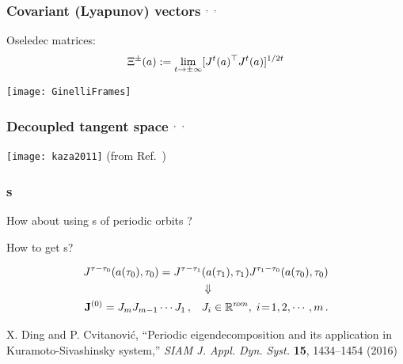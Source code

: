 \begin{frame}
  \frametitle{Covariant (Lyapunov) vectors
    $^,$
    $^,$
    }

  Oseledec matrices:
  \begin{equation}
    \Xi^{\pm}(a) :=\lim_{t\to\pm\infty}[J^t(a)^\top J^{t}(a)]^{1/2t}
    \label{eq:oseledets}
  \end{equation}

  {\centering
    \texttt{[image: GinelliFrames]}
  \par}

\end{frame}

\begin{frame}
  \frametitle{Decoupled tangent space
    $^,$
    $^,$
  }

  {\centering
    \texttt{[image: kaza2011]} %
    \scriptsize
    (from Ref.~)
    \par}

\end{frame}

\begin{frame}[shrink]%
  \frametitle{\Fv s}

  \begin{center}
    \large How about using \Fv s of periodic orbits ?
  \end{center}

  \pause

  \begin{center}
    \large How to get \Fv s?
  \end{center}

  \pause

  \begin{align*}
    J^{\tau-\tau_{0}}(a(\tau_{0}) ,\tau_{0})
    =
    J^{\tau-\tau_{1}} & (a(\tau_{1}),\tau_{1})
    J^{\tau_{1}-\tau_{0}}(a(\tau_{0}),\tau_{0})
    \\
    & \Downarrow \\
    \mathbf{J}^{(0)}=J_{m}J_{m-1}\cdots J_{1}\,,\quad
    & J_{i}\in \mathbb{R}^{n\!\times\! n},\; i\!=\!1,2,\cdots,m
    \,.
  \end{align*}


  \vfill


  \begin{block}{ \Ped }
    \textrm{
      \small
      X. Ding  and P. Cvitanovi\'c,
      ``Periodic eigendecomposition and its application in
      Kuramoto-Sivashinsky system,''
      {\color{red} \emph{SIAM J. Appl. Dyn. Syst.}} {\bf 15}, 1434--1454 (2016)
    }
  \end{block}



\end{frame}
